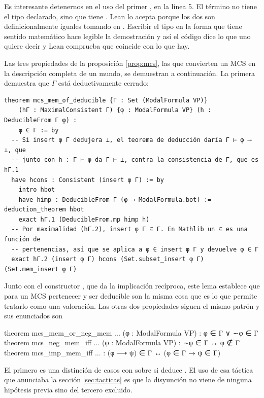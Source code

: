 Es interesante detenernos en el uso del primer , en la línea 5. El término  no tiene el tipo declarado, sino que tiene . Lean lo acepta porque los dos son definicionalmente iguales tomando  en . Escribir el tipo en la forma que tiene sentido matemático  hace legible la demostración y así el código dice lo que uno quiere decir y Lean comprueba que coincide con lo que hay.

Las tres propiedades de la proposición \ref{prop:mcs}, las que convierten un MCS en la descripción completa de un mundo, se demuestran a continuación. La primera demuestra que $\Gamma$ está deductivamente cerrado:

\begin{lstlisting}
theorem mcs_mem_of_deducible {Γ : Set (ModalFormula VP)}
    (hΓ : MaximalConsistent Γ) {φ : ModalFormula VP} (h : DeducibleFrom Γ φ) :
    φ ∈ Γ := by
  -- Si insert φ Γ dedujera ⊥, el teorema de deducción daría Γ ⊢ φ ⟶ ⊥, que
  -- junto con h : Γ ⊢ φ da Γ ⊢ ⊥, contra la consistencia de Γ, que es hΓ.1
  have hcons : Consistent (insert φ Γ) := by
    intro hbot
    have himp : DeducibleFrom Γ (φ ⟶ ModalFormula.bot) := deduction_theorem hbot
    exact hΓ.1 (DeducibleFrom.mp himp h)
  -- Por maximalidad (hΓ.2), insert φ Γ ⊆ Γ. En Mathlib un ⊆ es una función de
  -- pertenencias, así que se aplica a φ ∈ insert φ Γ y devuelve φ ∈ Γ
  exact hΓ.2 (insert φ Γ) hcons (Set.subset_insert φ Γ) (Set.mem_insert φ Γ)
\end{lstlisting}

Junto con el constructor , que da la implicación recíproca, este lema establece que para un MCS pertenecer y ser deducible son la misma cosa que es lo que permite tratarlo como una valoración. Las otras dos propiedades siguen el mismo patrón y sus enunciados son

\begin{leansnippet}
theorem mcs_mem_or_neg_mem ... (φ : ModalFormula VP) : φ ∈ Γ ∨ ∼φ ∈ Γ
theorem mcs_neg_mem_iff ... (φ : ModalFormula VP) : ∼φ ∈ Γ ↔ φ ∉ Γ
theorem mcs_imp_mem_iff ... : (φ ⟶ ψ) ∈ Γ ↔ (φ ∈ Γ → ψ ∈ Γ)
\end{leansnippet}

El primero es una distinción de casos con  sobre si  deduce . El uso de esa táctica que anunciaba la sección \ref{sec:tacticas} es que la disyunción no viene de ninguna hipótesis previa sino del tercero excluido.

